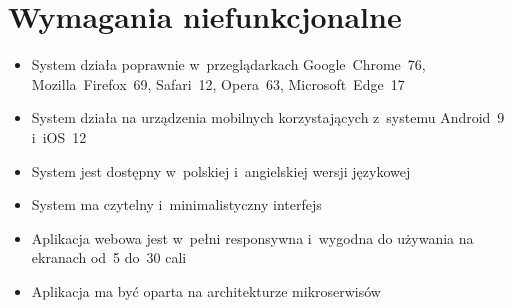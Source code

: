 \newpage

\section{Wymagania niefunkcjonalne}\label{sec:nonfunctional-requirements}
\begin{itemize}
    \item System działa poprawnie w~przeglądarkach Google~Chrome~76, Mozilla~Firefox~69, Safari~12, Opera~63, Microsoft~Edge~17
    \item System działa na urządzenia mobilnych korzystających z~systemu Android~9 i~iOS~12
    \item System jest dostępny w~polskiej i~angielskiej wersji językowej
    \item System ma czytelny i~minimalistyczny interfejs
    \item Aplikacja webowa jest w~pełni responsywna i~wygodna do używania na ekranach od~5 do~30 cali
    \item Aplikacja ma być oparta na architekturze mikroserwisów
\end{itemize}
\thispagestyle{normal}


